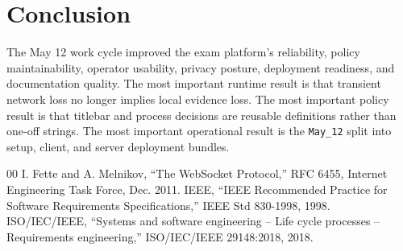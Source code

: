\documentclass[conference]{IEEEtran}
\begin{document}
\section{Conclusion}

The May 12 work cycle improved the exam platform's reliability, policy maintainability, operator usability, privacy posture, deployment readiness, and documentation quality. The most important runtime result is that transient network loss no longer implies local evidence loss. The most important policy result is that titlebar and process decisions are reusable definitions rather than one-off strings. The most important operational result is the \texttt{May\_12} split into setup, client, and server deployment bundles.

\begin{thebibliography}{00}
 I. Fette and A. Melnikov, ``The WebSocket Protocol,'' RFC 6455, Internet Engineering Task Force, Dec. 2011.
 IEEE, ``IEEE Recommended Practice for Software Requirements Specifications,'' IEEE Std 830-1998, 1998.
 ISO/IEC/IEEE, ``Systems and software engineering -- Life cycle processes -- Requirements engineering,'' ISO/IEC/IEEE 29148:2018, 2018.
\end{thebibliography}
\end{document}
